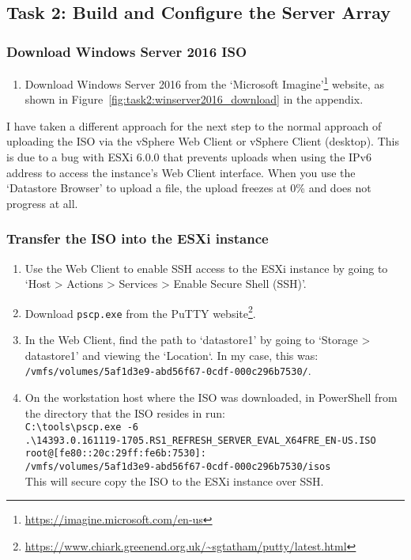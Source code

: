 \pagebreak
\subsection{Task 2: Build and Configure the Server Array}

\subsubsection{Download Windows Server 2016 ISO}
\begin{enumerate}[series=task2methodology1]
  \item Download Windows Server 2016 from the `Microsoft Imagine'\footnote{\url{https://imagine.microsoft.com/en-us}} website, as shown in Figure~\ref{fig:task2:winserver2016_download} in the  appendix.
\end{enumerate}

\noindent I have taken a different approach for the next step to the normal approach of uploading the ISO via the vSphere Web Client or vSphere Client (desktop). This is due to a bug with ESXi 6.0.0 that prevents uploads when using the IPv6 address to access the instance's Web Client interface. When you use the `Datastore Browser' to upload a file, the upload freezes at 0\% and does not progress at all.

\subsubsection{Transfer the ISO into the ESXi instance}
\begin{enumerate}[resume*=task2methodology1]
  \item Use the Web Client to enable SSH access to the ESXi instance by going to `Host > Actions > Services > Enable Secure Shell (SSH)'.
  \item Download \texttt{pscp.exe} from the PuTTY website\footnote{\url{https://www.chiark.greenend.org.uk/~sgtatham/putty/latest.html}}.
  \item In the Web Client, find the path to `datastore1' by going to `Storage > datastore1' and viewing the `Location`. In my case, this was:\\ \texttt{/vmfs/volumes/5af1d3e9-abd56f67-0cdf-000c296b7530/}.
  \item On the workstation host where the ISO was downloaded, in PowerShell from the directory that the ISO resides in run:\\
  \texttt{C:\textbackslash tools\textbackslash pscp.exe -6}\\
  \texttt{.\textbackslash 14393.0.161119-1705.RS1\_REFRESH\_SERVER\_EVAL\_X64FRE\_EN-US.ISO}\\
  \texttt{root@[fe80::20c:29ff:fe6b:7530]:}\\
  \texttt{/vmfs/volumes/5af1d3e9-abd56f67-0cdf-000c296b7530/isos}\\
  This will secure copy the ISO to the ESXi instance over SSH.
\end{enumerate}

